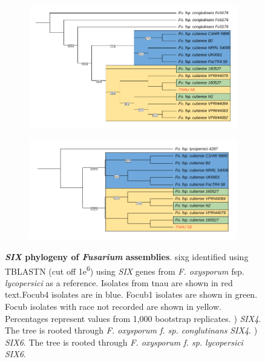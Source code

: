 \begin{figure}[hp!]
\centering
    \begin{subfigure}[]{0.9\textwidth}
        \centering
        \includegraphics[width=\textwidth]{Figures/FusSIX4.phylo.pdf}
        \caption{}
        \label{fig:FusSIX4.phylo}
    \end{subfigure}
        \begin{subfigure}[]{0.9\textwidth}
        \centering
        \includegraphics[width=\textwidth]{Figures/FusSIX6.phylo.pdf}
        \caption{}
        \label{fig:FusSIX6.phylo}
    \end{subfigure}
    \caption[\textit{SIX} gene phylogeny of \textit{Fusarium} assemblies]{\textbf{\textit{SIX} phylogeny of \textit{Fusarium} assemblies}.
    \acl{sixg} identified using TBLASTN (cut off 1\-e\textsuperscript{6}) using \textit{SIX} genes from \textit{F. oxysporum} fsp. \textit{lycopersici} as a reference. Isolates from \ac{tnau} are shown in red text.\Acl{Focub4} isolates are in blue. \Acl{Focub1} isolates are shown in green. \acl{Focub} isolates with race not recorded are shown in yellow. Percentages represent values from 1,000 bootstrap replicates. ) \textit{SIX4}. The tree is rooted through \textit{F. oxysporum f. sp. conglutinans} \textit{SIX4}. ) \textit{SIX6}. The tree is rooted through \textit{F. oxysporum f. sp. lycopersici} \textit{SIX6}.}
    \label{fig:FusSIXMultiPhylo}
\end{figure}


